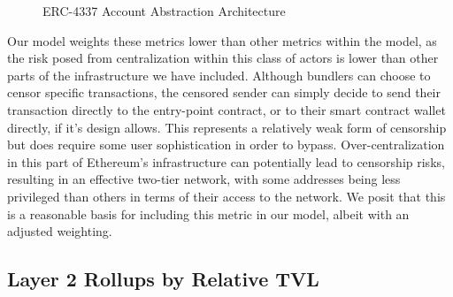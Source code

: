 \documentclass[conference]{IEEEtran}
\begin{document}
\begin{figure}[h]

\caption{ERC-4337 Account Abstraction Architecture}
\label{fig:4337 architecture}
\end{figure}

Our model weights these metrics lower than other metrics within the model, as the risk posed from centralization within this class of actors is lower than other parts of the infrastructure we have included.  Although bundlers can choose to censor specific transactions, the censored sender can simply decide to send their transaction directly to the entry-point contract, or to their smart contract wallet directly, if it's design allows.  This represents a relatively weak form of censorship but does require some user sophistication in order to bypass. Over-centralization in this part of Ethereum's infrastructure can potentially lead to censorship risks, resulting in an effective two-tier network, with some addresses being less privileged than others in terms of their access to the network. We posit that this is a reasonable basis for including this metric in our model, albeit with an adjusted weighting.

\subsection{Layer 2 Rollups by Relative TVL}
\end{document}
